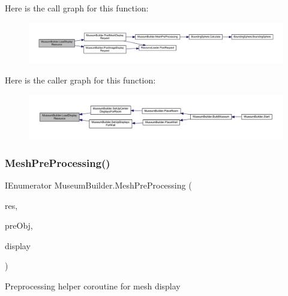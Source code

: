 Here is the call graph for this function\+:
\nopagebreak
\begin{figure}[H]
\begin{center}
\leavevmode
\includegraphics[width=350pt]{class_museum_builder_a09f7bfa34308891e3a2bf306c2b0d5e2_cgraph}
\end{center}
\end{figure}
Here is the caller graph for this function\+:
\nopagebreak
\begin{figure}[H]
\begin{center}
\leavevmode
\includegraphics[width=350pt]{class_museum_builder_a09f7bfa34308891e3a2bf306c2b0d5e2_icgraph}
\end{center}
\end{figure}
\mbox{\label{class_museum_builder_a695eba49b601fcd36a6f5477ce2c1511}} 
\subsubsection{\texorpdfstring{Mesh\+Pre\+Processing()}{MeshPreProcessing()}}
{\footnotesize\ttfamily I\+Enumerator Museum\+Builder.\+Mesh\+Pre\+Processing (\begin{DoxyParamCaption}\item[{\mbox{\hyperlink{class_display_mesh_resource}{Display\+Mesh\+Resource}}}]{res,  }\item[{\mbox{\hyperlink{class_pre_processing_game_object_information}{Pre\+Processing\+Game\+Object\+Information}}}]{pre\+Obj,  }\item[{\mbox{\hyperlink{class_display}{Display}}}]{display }\end{DoxyParamCaption})\hspace{0.3cm}{\ttfamily [private]}}



Preprocessing helper coroutine for mesh display 


